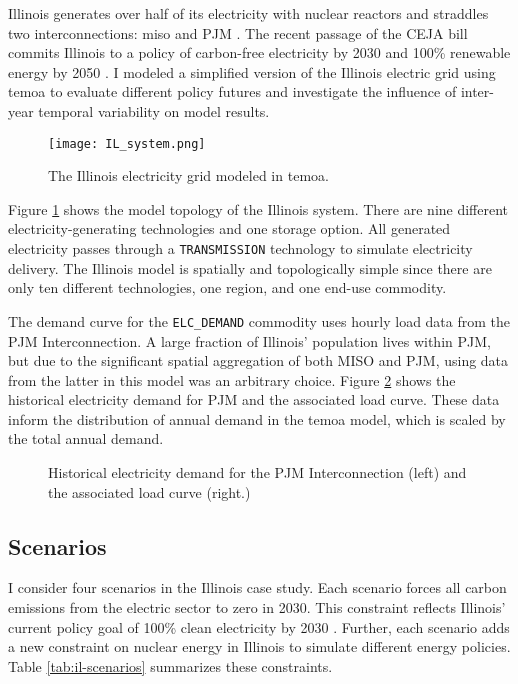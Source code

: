 Illinois generates over half of its electricity with nuclear reactors
and straddles two interconnections: \gls{miso} and PJM
\cite{energy_information_administration_eia_nodate}. The recent
passage of the CEJA bill commits Illinois to a policy of carbon-free electricity
by 2030 and 100\% renewable energy by 2050 \cite{harmon_climate_2021}.
I modeled a simplified version of the Illinois electric grid using \gls{temoa}
to evaluate different policy futures and investigate the influence of inter-year
temporal variability on model results.

\begin{figure}[H]
  \centering
  \texttt{[image: IL\_system.png]}
  \caption{The Illinois electricity grid modeled in \gls{temoa}.}
  \label{fig:ilsys}
\end{figure}

Figure \ref{fig:ilsys} shows the model topology of the Illinois system. There
are nine different electricity-generating technologies and one storage option.
All generated electricity passes through a \texttt{TRANSMISSION} technology
to simulate electricity delivery. The Illinois model is spatially and topologically
simple since there are only ten different technologies, one region, and one
end-use commodity.

The demand curve for the \texttt{ELC\_DEMAND} commodity uses hourly load
data from the PJM Interconnection. A large fraction of Illinois' population lives
within PJM, but due to the significant spatial aggregation of both MISO and PJM,
using data from the latter in this model was an arbitrary choice. Figure \ref{fig:pjm-elc}
shows the historical electricity demand for PJM and the associated load curve. These
data inform the distribution of annual demand in the \gls{temoa} model, which is
scaled by the total annual demand.

\begin{figure}[H]
  \centering
  \resizebox{\columnwidth}{!}{}
  \caption{Historical electricity demand for the PJM Interconnection (left) and
  the associated load curve (right.)}
  \label{fig:pjm-elc}
\end{figure}

\subsection{Scenarios}
I consider four scenarios in the Illinois case study. Each scenario forces
all carbon emissions from the electric sector to zero in 2030. This constraint
reflects Illinois' current policy goal of 100\% clean electricity by 2030
\cite{office_of_governor_jb_pritzker_gov_2021}.
Further, each scenario adds a new constraint on nuclear energy in Illinois to
simulate different energy policies. Table \ref{tab:il-scenarios} summarizes these
constraints.

